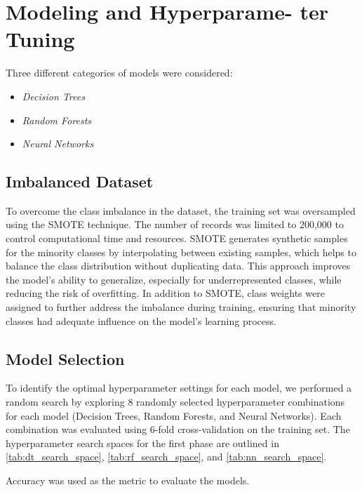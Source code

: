 \section{Modeling and Hyperparame-
ter Tuning}

Three different categories of models were
considered:
\begin{itemize}
    \item \textit{Decision Trees}
    \item \textit{Random Forests}
    \item \textit{Neural Networks}
\end{itemize}


\subsection{Imbalanced Dataset}
To overcome the class imbalance in the dataset, 
the training set was oversampled using the SMOTE 
technique. The number of records was limited to 
200,000 to control computational time and resources. 
SMOTE generates synthetic samples for the minority 
classes by interpolating between existing samples, 
which helps to balance the class distribution without 
duplicating data. This approach improves the model's 
ability to generalize, especially for underrepresented 
classes, while reducing the risk of overfitting. 
In addition to SMOTE, class weights were assigned 
to further address the imbalance during training, 
ensuring that minority classes had adequate influence 
on the model’s learning process. 

\subsection{Model Selection}
To identify the optimal hyperparameter settings for 
each model, we performed a random search by exploring 
8 randomly selected hyperparameter combinations for 
each model (Decision Trees, Random Forests, and 
Neural Networks). Each combination was evaluated 
using 6-fold cross-validation on the training set. 
The hyperparameter search spaces for the first phase 
are outlined in \autoref{tab:dt_search_space}, 
\autoref{tab:rf_search_space}, and 
\autoref{tab:nn_search_space}.

Accuracy was used as the metric to evaluate
the models.


